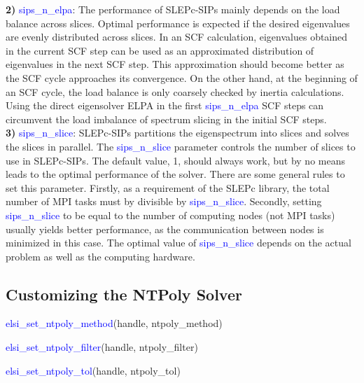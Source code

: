 \documentclass{report}
\begin{document}
\textbf{2)} \textcolor{blue}{sips\_n\_elpa}:  The performance of SLEPc-SIPs mainly depends on the load balance across slices.  Optimal performance is expected if the desired eigenvalues are evenly distributed across slices.  In an SCF calculation, eigenvalues obtained in the current SCF step can be used as an approximated distribution of eigenvalues in the next SCF step.  This approximation should become better as the SCF cycle approaches its convergence.  On the other hand, at the beginning of an SCF cycle, the load balance is only coarsely checked by inertia calculations.  Using the direct eigensolver ELPA in the first \textcolor{blue}{sips\_n\_elpa} SCF steps can circumvent the load imbalance of spectrum slicing in the initial SCF steps.\\

\textbf{3)} \textcolor{blue}{sips\_n\_slice}:  SLEPc-SIPs partitions the eigenspectrum into slices and solves the slices in parallel.  The \textcolor{blue}{sips\_n\_slice} parameter controls the number of slices to use in SLEPc-SIPs.  The default value, 1, should always work, but by no means leads to the optimal performance of the solver.  There are some general rules to set this parameter.  Firstly, as a requirement of the SLEPc library, the total number of MPI tasks must by divisible by \textcolor{blue}{sips\_n\_slice}.  Secondly, setting \textcolor{blue}{sips\_n\_slice} to be equal to the number of computing nodes (not MPI tasks) usually yields better performance, as the communication between nodes is minimized in this case.  The optimal value of \textcolor{blue}{sips\_n\_slice} depends on the actual problem as well as the computing hardware.\\

\subsection{Customizing the NTPoly Solver}
\label{subsec:setter_ntpoly}
\begin{labeling}{\hspace{6cm}}
\item [\hspace{0.3cm} \textcolor{blue}{elsi\_set\_ntpoly\_method}(handle, ntpoly\_method)]
\item [\hspace{0.3cm} \textcolor{blue}{elsi\_set\_ntpoly\_filter}(handle, ntpoly\_filter)]
\item [\hspace{0.3cm} \textcolor{blue}{elsi\_set\_ntpoly\_tol}(handle, ntpoly\_tol)]
\end{labeling}
\end{document}
